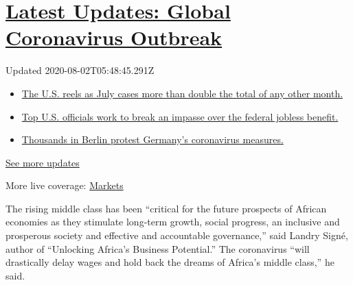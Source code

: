 \hypertarget{latest-updates-global-coronavirus-outbreak}{%
\section{\texorpdfstring{\href{https://www.nytimes.com/2020/08/01/world/coronavirus-covid-19.html?action=click\&pgtype=Article\&state=default\&region=MAIN_CONTENT_1\&context=storylines_live_updates}{Latest
Updates: Global Coronavirus
Outbreak}}{Latest Updates: Global Coronavirus Outbreak}}\label{latest-updates-global-coronavirus-outbreak}}

Updated 2020-08-02T05:48:45.291Z

\begin{itemize}
\tightlist
\item
  \href{https://www.nytimes.com/2020/08/01/world/coronavirus-covid-19.html?action=click\&pgtype=Article\&state=default\&region=MAIN_CONTENT_1\&context=storylines_live_updates\#link-34047410}{The
  U.S. reels as July cases more than double the total of any other
  month.}
\item
  \href{https://www.nytimes.com/2020/08/01/world/coronavirus-covid-19.html?action=click\&pgtype=Article\&state=default\&region=MAIN_CONTENT_1\&context=storylines_live_updates\#link-780ec966}{Top
  U.S. officials work to break an impasse over the federal jobless
  benefit.}
\item
  \href{https://www.nytimes.com/2020/08/01/world/coronavirus-covid-19.html?action=click\&pgtype=Article\&state=default\&region=MAIN_CONTENT_1\&context=storylines_live_updates\#link-25930521}{Thousands
  in Berlin protest Germany's coronavirus measures.}
\end{itemize}

\href{https://www.nytimes.com/2020/08/01/world/coronavirus-covid-19.html?action=click\&pgtype=Article\&state=default\&region=MAIN_CONTENT_1\&context=storylines_live_updates}{See
more updates}

More live coverage:
\href{https://www.nytimes.com/live/2020/07/31/business/stock-market-today-coronavirus?action=click\&pgtype=Article\&state=default\&region=MAIN_CONTENT_1\&context=storylines_live_updates}{Markets}

The rising middle class has been ``critical for the future prospects of
African economies as they stimulate long-term growth, social progress,
an inclusive and prosperous society and effective and accountable
governance,'' said Landry Signé, author of ``Unlocking Africa's Business
Potential.'' The coronavirus ``will drastically delay wages and hold
back the dreams of Africa's middle class,'' he said.

